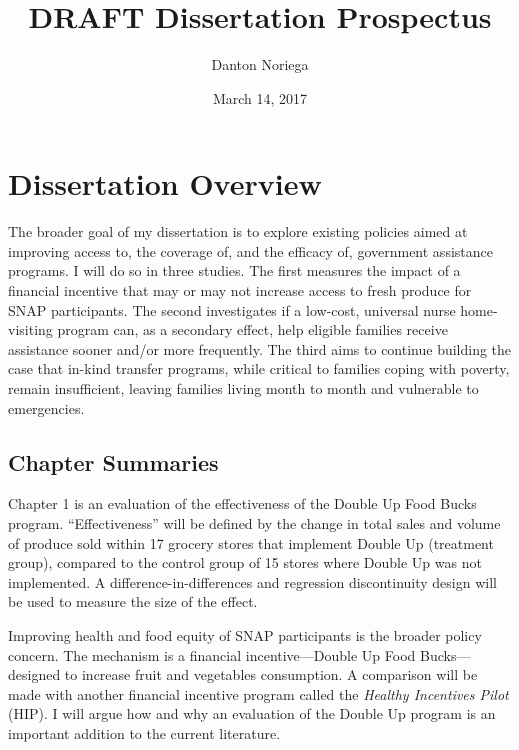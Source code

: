 \documentclass[12pt,letterpaperpaper,]{book}
\title{DRAFT Dissertation Prospectus}
\author{Danton Noriega}
\date{March 14, 2017}
\begin{document}
\maketitle

\setlength{\abovedisplayskip}{-5pt}
\setlength{\abovedisplayshortskip}{-5pt}
\mainmatter

{
\setcounter{tocdepth}{2}
\tableofcontents
}
\chapter*{Dissertation Overview}\label{dissertation-overview}

The broader goal of my dissertation is to explore existing policies
aimed at improving access to, the coverage of, and the efficacy of,
government assistance programs. I will do so in three studies. The first
measures the impact of a financial incentive that may or may not
increase access to fresh produce for SNAP participants. The second
investigates if a low-cost, universal nurse home-visiting program can,
as a secondary effect, help eligible families receive assistance sooner
and/or more frequently. The third aims to continue building the case
that in-kind transfer programs, while critical to families coping with
poverty, remain insufficient, leaving families living month to month and
vulnerable to emergencies.

\section*{Chapter Summaries}\label{chapter-summaries}

Chapter 1 is an evaluation of the effectiveness of the Double Up Food
Bucks program. ``Effectiveness'' will be defined by the change in total
sales and volume of produce sold within 17 grocery stores that implement
Double Up (treatment group), compared to the control group of 15 stores
where Double Up was not implemented. A difference-in-differences and
regression discontinuity design will be used to measure the size of the
effect.

Improving health and food equity of SNAP participants is the broader
policy concern. The mechanism is a financial incentive---Double Up Food
Bucks---designed to increase fruit and vegetables consumption. A
comparison will be made with another financial incentive program called
the \emph{Healthy Incentives Pilot} (HIP). I will argue how and why an
evaluation of the Double Up program is an important addition to the
current literature.
\end{document}
